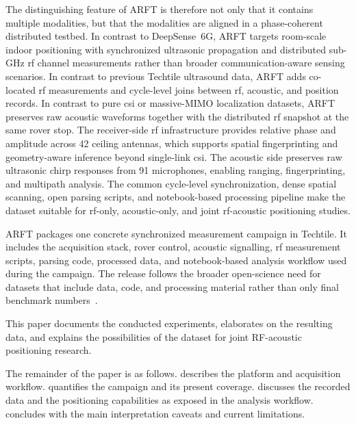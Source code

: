 The distinguishing feature of ARFT is therefore not only that it contains multiple modalities, but that the modalities are aligned in a phase-coherent distributed testbed. In contrast to DeepSense~6G, ARFT targets room-scale indoor positioning with synchronized ultrasonic propagation and distributed sub-GHz \gls{rf} channel measurements rather than broader communication-aware sensing scenarios. In contrast to previous Techtile ultrasound data, ARFT adds co-located \gls{rf} measurements and cycle-level joins between \gls{rf}, acoustic, and position records. In contrast to pure \gls{csi} or massive-MIMO localization datasets, ARFT preserves raw acoustic waveforms together with the distributed \gls{rf} snapshot at the same rover stop. The receiver-side \gls{rf} infrastructure provides relative phase and amplitude across 42 ceiling antennas, which supports spatial fingerprinting and geometry-aware inference beyond single-link \gls{csi}. The acoustic side preserves raw ultrasonic chirp responses from 91 microphones, enabling ranging, fingerprinting, and multipath analysis. The common cycle-level synchronization, dense spatial scanning, open parsing scripts, and notebook-based processing pipeline make the dataset suitable for \gls{rf}-only, acoustic-only, and joint \gls{rf}-acoustic positioning studies.

ARFT packages one concrete synchronized measurement campaign in Techtile. It includes the acquisition stack, rover control, acoustic signalling, \gls{rf} measurement scripts, parsing code, processed data, and notebook-based analysis workflow used during the campaign. The release follows the broader open-science need for datasets that include data, code, and processing material rather than only final benchmark numbers~\cite{overview_datasets_indoor_positioning,dss6g}.

This paper documents the conducted experiments, elaborates on the resulting data, and explains the possibilities of the dataset for joint RF-acoustic positioning research.

The remainder of the paper is as follows.  describes the platform and acquisition workflow.  quantifies the campaign and its present coverage.  discusses the recorded data and the positioning capabilities as exposed in the analysis workflow.  concludes with the main interpretation caveats and current limitations.
